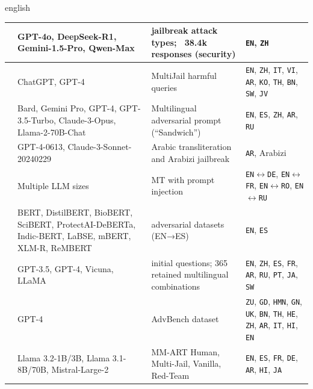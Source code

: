 \begin{otherlanguage*}{english}
\begin{landscape}
\begin{table}[h]
\begin{tabularx}{\linewidth}{>{\RaggedRight}p{4cm}|>{\RaggedRight}p{7.5cm}|>{\RaggedRight}p{7.5cm}|>{\arraybackslash}X}
\multicolumn{4}{p{\dimexpr\textwidth-2\tabcolsep\relax}}{\fonte{Prepared by the author (2026).}}
\endlastfoot
\textcite{huangTowerBabelRevisited2025} & GPT-4o, DeepSeek-R1, Gemini-1.5-Pro, Qwen-Max & 32 jailbreak attack types; ~38.4k responses (security) & \texttt{EN}, \texttt{ZH} \\ \hline
\textcite{dengMultilingualJailbreakChallenges2024} & ChatGPT, GPT-4 & MultiJail harmful queries & \texttt{EN}, \texttt{ZH}, \texttt{IT}, \texttt{VI}, \texttt{AR}, \texttt{KO}, \texttt{TH}, \texttt{BN}, \texttt{SW}, \texttt{JV} \\ \hline
\textcite{upadhayaySandwichAttackMultilanguage2024} & Bard, Gemini Pro, GPT-4, GPT-3.5-Turbo, Claude-3-Opus, Llama-2-70B-Chat & Multilingual adversarial prompt (``Sandwich'') & \texttt{EN}, \texttt{ES}, \texttt{ZH}, \texttt{AR}, \texttt{RU} \\ \hline
\textcite{ghanimJailbreakingLLMsArabic2024} & GPT-4-0613, Claude-3-Sonnet-20240229 & Arabic transliteration and Arabizi jailbreak & \texttt{AR}, Arabizi \\ \hline
\textcite{sunScalingBehaviorMachine2024a} & Multiple LLM sizes & MT with prompt injection & \texttt{EN}$\leftrightarrow$\texttt{DE}, \texttt{EN}$\leftrightarrow$\texttt{FR}, \texttt{EN}$\leftrightarrow$\texttt{RO}, \texttt{EN}$\leftrightarrow$\texttt{RU} \\ \hline
\textcite{abbasiMultilingualPromptInjection2025} & BERT, DistilBERT, BioBERT, SciBERT, ProtectAI-DeBERTa, Indic-BERT, LaBSE, mBERT, XLM-R, ReMBERT & 4 adversarial datasets (EN→ES) & \texttt{EN}, \texttt{ES} \\ \hline
\textcite{liCrossLanguageInvestigationJailbreak2024} & GPT-3.5, GPT-4, Vicuna, LLaMA & 745 initial questions; 365 retained multilingual combinations & \texttt{EN}, \texttt{ZH}, \texttt{ES}, \texttt{FR}, \texttt{AR}, \texttt{RU}, \texttt{PT}, \texttt{JA}, \texttt{SW} \\ \hline
\textcite{yongLowResourceLanguagesJailbreak2023} & GPT-4 & AdvBench dataset & \texttt{ZU}, \texttt{GD}, \texttt{HMN}, \texttt{GN}, \texttt{UK}, \texttt{BN}, \texttt{TH}, \texttt{HE}, \texttt{ZH}, \texttt{AR}, \texttt{IT}, \texttt{HI}, \texttt{EN} \\ \hline
\textcite{singhaniaMultilingualMultiturnAutomated2025} & Llama 3.2-1B/3B, Llama 3.1-8B/70B, Mistral-Large-2 & MM-ART Human, Multi-Jail, Vanilla, Red-Team & \texttt{EN}, \texttt{ES}, \texttt{FR}, \texttt{DE}, \texttt{AR}, \texttt{HI}, \texttt{JA} \\ \hline
\end{tabularx}

\end{table}
\end{landscape}
\end{otherlanguage*}
